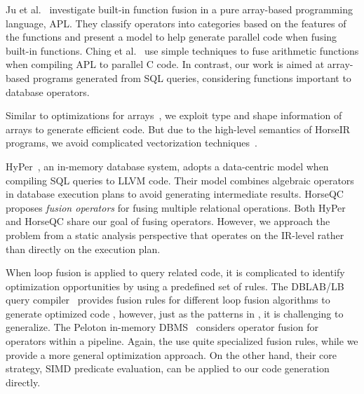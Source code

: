 Ju et al.~\cite{ju1994:array} investigate built-in function fusion in a pure
array-based programming language, APL. They classify operators into categories
based on the features of the functions and present a model to help generate
parallel code when fusing built-in functions. Ching et al.~\cite{ChingZ12parallel}
use simple techniques to fuse arithmetic functions when compiling APL to parallel
C code. In contrast, our work is aimed at array-based programs generated from
SQL queries, considering functions important to database operators.

Similar to optimizations for arrays~\cite{KumarH14,FoleyH16matjuice},
we exploit type and shape information of arrays to generate efficient code.
But due to the high-level semantics of HorseIR programs, we avoid
complicated vectorization techniques~\cite{menon1999case,ChenKLH16}.



HyPer~\cite{Neumann2011:HyPer}, an in-memory database system, adopts a data-centric
model when compiling SQL queries to LLVM code. Their model combines algebraic
operators in database execution plans to avoid generating intermediate results.
HorseQC~\cite{FunkeBNMT18:HorseQC} proposes \textit{fusion operators} for
fusing multiple relational operations. Both HyPer and HorseQC share our goal
of fusing operators. However, we approach the problem from a static analysis
perspective that operates on the IR-level rather than directly on the execution plan.

When loop fusion is applied to query related code, it is complicated to
identify optimization opportunities by using a predefined set of rules.
The DBLAB/LB query compiler~\cite{ShaikhhaKPBD016} provides fusion rules for
different loop fusion algorithms to generate optimized code
\cite{Shaikhha2018:LoopFusion}, however, just as the patterns in \OldPaper, it is
challenging to generalize. %
The Peloton in-memory DBMS~\cite{Menon2017:Peloton} considers operator
fusion for operators within a pipeline. Again, the use quite specialized fusion
rules, while we provide a more general optimization approach.
On the other hand, their core strategy, SIMD predicate evaluation, can
be applied to our code generation directly.


